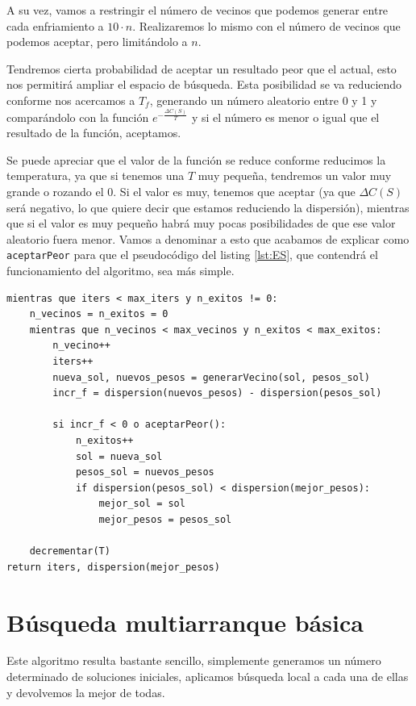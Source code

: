 A su vez, vamos a restringir el número de vecinos que podemos generar entre cada enfriamiento a $10 \cdot n$. Realizaremos lo mismo con el número de vecinos que podemos aceptar, pero limitándolo a $n$.

Tendremos cierta probabilidad de aceptar un resultado peor que el actual, esto nos permitirá ampliar el espacio de búsqueda.
Esta posibilidad se va reduciendo conforme nos acercamos a $T_f$, generando un número aleatorio entre 0 y 1 y comparándolo con la función $\displaystyle e^{-\frac{\Delta C(S)}{T}}$ y si el número es menor o igual que el resultado de la función, aceptamos.

Se puede apreciar que el valor de la función se reduce conforme reducimos la temperatura, ya que si tenemos una $T$ muy pequeña, tendremos un valor muy grande o rozando el 0. Si el valor es muy, tenemos que aceptar (ya que $\Delta C(S)$ será negativo, lo que quiere decir que estamos reduciendo la dispersión), mientras que si el valor es muy pequeño habrá muy pocas posibilidades de que ese valor aleatorio fuera menor. Vamos a denominar a esto que acabamos de explicar como \texttt{aceptarPeor} para que el pseudocódigo del listing \ref{lst:ES}, que contendrá el funcionamiento del algoritmo, sea más simple.

\begin{lstlisting}[frame=single, caption={Enfriamiento simulado}, captionpos=b, label=lst:ES]
mientras que iters < max_iters y n_exitos != 0:
    n_vecinos = n_exitos = 0
    mientras que n_vecinos < max_vecinos y n_exitos < max_exitos:
        n_vecino++
        iters++
        nueva_sol, nuevos_pesos = generarVecino(sol, pesos_sol)
        incr_f = dispersion(nuevos_pesos) - dispersion(pesos_sol)
        
        si incr_f < 0 o aceptarPeor():
            n_exitos++
            sol = nueva_sol
            pesos_sol = nuevos_pesos         
            if dispersion(pesos_sol) < dispersion(mejor_pesos):
                mejor_sol = sol
                mejor_pesos = pesos_sol
                
    decrementar(T)
return iters, dispersion(mejor_pesos)
\end{lstlisting}


\section{Búsqueda multiarranque básica}

Este algoritmo resulta bastante sencillo, simplemente generamos un número determinado de soluciones iniciales, aplicamos búsqueda local a cada una de ellas y devolvemos la mejor de todas.

